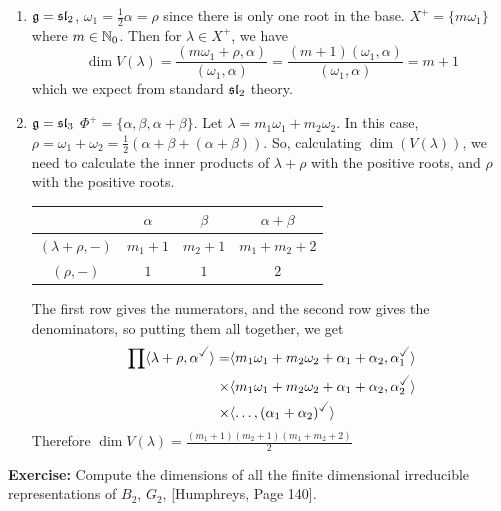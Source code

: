 \documentclass{article}
\begin{document}
\begin{exs*}\hspace{0.1cm}
    \begin{enumerate}
        \item $\mathfrak{g} = \mathfrak{sl}_{2}$, $\omega_{1}= \frac{1}{2}\alpha = \rho$ since there is only one root in the base. $X^{+} = \{m \omega_{1}\}$ where $m \in \mathbb{N}_{0}$. Then for $\lambda \in X^{+}$, we have \[ \dim V(\lambda) = \frac{(m\omega_{1} + \rho, \alpha)}{(\omega_{1}, \alpha)} = \frac{(m+1)(\omega_{1},\alpha)}{(\omega_{1},\alpha)} = m+1\] which we expect from standard $\mathfrak{sl}_{2}$ theory.
        \item $\mathfrak{g} = \mathfrak{sl}_{3}$ $\Phi^{+} = \{ \alpha, \beta, \alpha + \beta\}$. Let $\lambda = m_{1}\omega_{1} + m_{2}\omega_{2}$. In this case, $\rho = \omega_{1} + \omega_{2} = \frac{1}{2}(\alpha + \beta + (\alpha + \beta))$. So, calculating $\dim(V(\lambda))$, we need to calculate the inner products of $\lambda +\rho$ with the positive roots, and $\rho$ with the positive roots. \gap \begin{center}
            \begin{tabular}{c | c c c}
                & $\alpha$ & $\beta$ & $\alpha + \beta$\\
                \hline $(\lambda + \rho, -)$ & $m_{1} + 1$ & $m_{2} + 1$ & $m_{1} + m_{2} + 2$ \\
                $(\rho, -)$ & $1$ & $1$ & $2$
            \end{tabular}
        \end{center}
        The first row gives the numerators, and the second row gives the denominators, so putting them all together, we get \begin{align*}
            \prod \langle \lambda + \rho, \alpha^{\checked} \rangle = &\langle m_{1} \omega_{1} + m_{2} \omega_{2} + \alpha_{1} + \alpha_{2}, \alpha_{1}^{\checked}\rangle\\
            \times &\langle m_{1} \omega_{1} + m_{2} \omega_{2} + \alpha_{1} + \alpha_{2}, \alpha_{2}^{\checked}\rangle\\
            \times & \langle \dots, (\alpha_{1}+\alpha_{2})^{\checked} \rangle
        \end{align*}
        Therefore $\dim V(\lambda) = \frac{(m_{1} + 1)(m_{2} + 1)(m_{1} + m_{2} + 2)}{2}$
    \end{enumerate}
\end{exs*}
\textbf{Exercise: }Compute the dimensions of all the finite dimensional irreducible representations of $B_{2}$, $G_{2}$, [Humphreys, Page 140].
\end{document}
